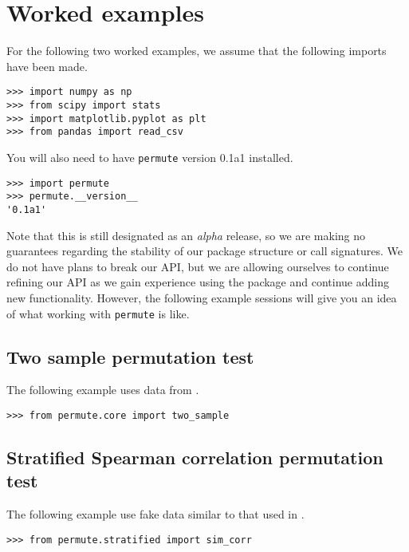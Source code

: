 \chapter{\label{app:ex}Worked examples}

For the following two worked examples, we assume that the following imports 
have been made.

\begin{verbatim}
>>> import numpy as np
>>> from scipy import stats
>>> import matplotlib.pyplot as plt
>>> from pandas import read_csv
\end{verbatim}

You will also need to have \texttt{permute} version 0.1a1 installed.

\begin{verbatim}
>>> import permute
>>> permute.__version__
'0.1a1'
\end{verbatim}

Note that this is still designated as an \emph{alpha} release, so we are
making no guarantees regarding the stability of our package structure
or call signatures.  We do not have plans to break our API, but we are
allowing ourselves to continue refining our API as we gain experience
using the package and continue adding new functionality.  However, the
following example sessions will give you an idea of what working with
\texttt{permute} is like.

\section{Two sample permutation test}

The following example uses data from \cite{macnell2014s}.

\begin{verbatim}
>>> from permute.core import two_sample
\end{verbatim}


\section{Stratified Spearman correlation permutation test}

The following example use fake data similar to that used in \cite{boring2015}.

\begin{verbatim}
>>> from permute.stratified import sim_corr
\end{verbatim}

